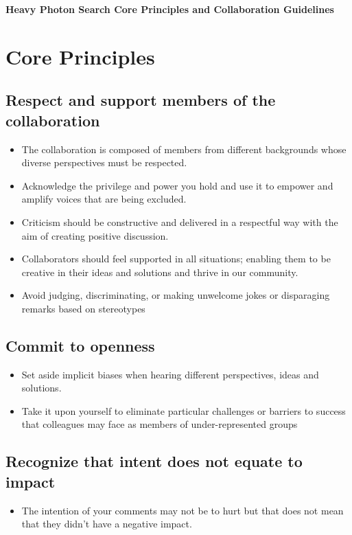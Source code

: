 \documentclass[10pt]{article}
\begin{document}
\begin{center}
\Large
\textbf{Heavy Photon Search Core Principles and Collaboration Guidelines}
\end{center}

\normalsize
\tableofcontents
\clearpage

\section{Core Principles}

\subsection{Respect and support members of the collaboration}
\begin{itemize}
    \item The collaboration is composed of members from different backgrounds whose
    diverse perspectives must be respected. 
    \item Acknowledge the privilege and power you hold and use it to empower 
    and amplify voices that are being excluded. 
    \item Criticism should be constructive and delivered in a respectful way
    with the aim of creating positive discussion. 
    \item Collaborators should feel supported in all situations; enabling 
    them to be creative in their ideas and solutions and thrive in our 
    community. 
    \item Avoid judging, discriminating, or making unwelcome jokes or disparaging remarks based on stereotypes
\end{itemize}

\subsection{Commit to openness}
\begin{itemize}
    \item Set aside implicit biases when hearing different perspectives, ideas and solutions.   
    \item Take it upon yourself to eliminate particular challenges or barriers to success that colleagues may face as members of under-represented groups
\end{itemize}

\subsection{Recognize that intent does not equate to impact}
\begin{itemize}
    \item The intention of your comments may not be to hurt but that does not
    mean that they didn't have a negative impact. 
\end{itemize}
\end{document}
